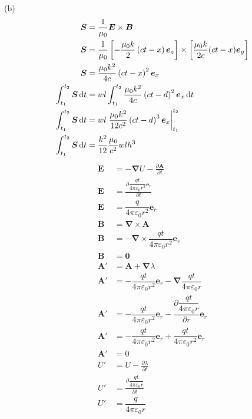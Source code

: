 (b)\begin{align*}
    \boldsymbol{S}&=\frac{1}{\mu_0}\boldsymbol{E}\times\boldsymbol{B}\\
    \boldsymbol{S}&=\frac{1}{\mu_0}\left[-\frac{\mu_0k}{2}\left(ct-x\right)\boldsymbol{e}_z\right]\times\left[\frac{\mu_0k}{2c}(ct-x)\boldsymbol{e}_y\right]\\
    \boldsymbol{S}&=\frac{\mu_0k^2}{4c}\left(ct-x\right)^2\boldsymbol{e}_x\\
    \int_{t_1}^{t_2}\boldsymbol{S}\dif t&=wl\int_{t_1}^{t_2}\frac{\mu_0k^2}{4c}\left(ct-d\right)^2\boldsymbol{e}_x\dif t\\
    \int_{t_1}^{t_2}\boldsymbol{S}\dif t&=wl\left.\frac{\mu_0k^2}{12c^2}\left(ct-d\right)^3\boldsymbol{e}_x\right|_{t_1}^{t_2}\\
    \int_{t_1}^{t_2}\boldsymbol{S}\dif t&=\frac{k^2}{12}\frac{\mu_0}{c^2}wlh^3
\end{align*}
\begin{align*}
    \boldsymbol{E}&=-\boldsymbol{\nabla}U-\frac{\partial\boldsymbol{A}}{\partial t}\\
    \boldsymbol{E}&=\frac{\partial\dfrac{qt}{4\pi\varepsilon_0r^2}\boldsymbol{e}_r}{\partial t}\\
    \boldsymbol{E}&=\dfrac{q}{4\pi\varepsilon_0r^2}\boldsymbol{e}_r\\
    \boldsymbol{B}&=\boldsymbol{\nabla}\times\boldsymbol{A}\\
    \boldsymbol{B}&=-\boldsymbol{\nabla}\times\dfrac{qt}{4\pi\varepsilon_0r^2}\boldsymbol{e}_r\\
    \boldsymbol{B}&=\boldsymbol{0}\\
    \boldsymbol{A}'&=\boldsymbol{A}+\boldsymbol{\nabla}\lambda\\
    \boldsymbol{A}'&=-\dfrac{qt}{4\pi\varepsilon_0r^2}\boldsymbol{e}_r-\boldsymbol{\nabla}\dfrac{qt}{4\pi\varepsilon_0r}\\
    \boldsymbol{A}'&=-\dfrac{qt}{4\pi\varepsilon_0r^2}\boldsymbol{e}_r-\dfrac{\partial \dfrac{qt}{4\pi\varepsilon_0r}}{\partial r}\boldsymbol{e}_r\\
    \boldsymbol{A}'&=-\dfrac{qt}{4\pi\varepsilon_0r^2}\boldsymbol{e}_r+\dfrac{qt}{4\pi\varepsilon_0r^2}\boldsymbol{e}_r\\
    \boldsymbol{A}'&=0\\
    U'&=U-\frac{\partial\lambda}{\partial t}\\
    U'&=\frac{\partial\dfrac{qt}{4\pi\varepsilon_0r}}{\partial t}\\
    U'&=\dfrac{q}{4\pi\varepsilon_0r}
\end{align*}
